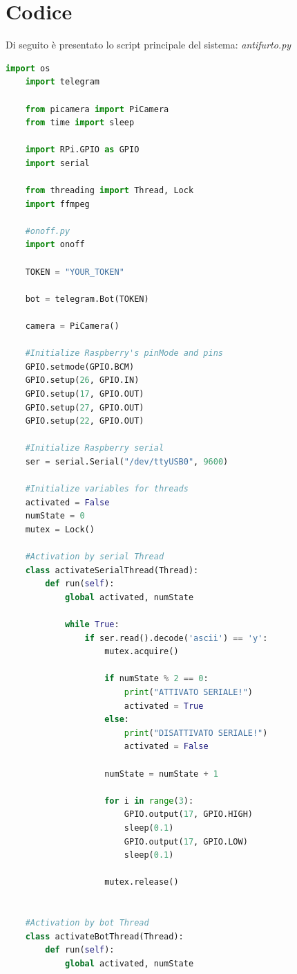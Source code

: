 \documentclass[12pt]{article}
\begin{document}
	\section{Codice}
	Di seguito è presentato lo script principale del sistema: \textit{antifurto.py}
	\begin{lstlisting}[language=Python]
	import os
	import telegram

	from picamera import PiCamera
	from time import sleep

	import RPi.GPIO as GPIO 
	import serial 

	from threading import Thread, Lock
	import ffmpeg

	#onoff.py
	import onoff

	TOKEN = "YOUR_TOKEN"

	bot = telegram.Bot(TOKEN)

	camera = PiCamera()

	#Initialize Raspberry's pinMode and pins
	GPIO.setmode(GPIO.BCM)
	GPIO.setup(26, GPIO.IN)
	GPIO.setup(17, GPIO.OUT)
	GPIO.setup(27, GPIO.OUT)
	GPIO.setup(22, GPIO.OUT)

	#Initialize Raspberry serial
	ser = serial.Serial("/dev/ttyUSB0", 9600)

	#Initialize variables for threads
	activated = False
	numState = 0
	mutex = Lock()

	#Activation by serial Thread
	class activateSerialThread(Thread):
    	def run(self):
        	global activated, numState

        	while True:
            	if ser.read().decode('ascii') == 'y':
                	mutex.acquire()
                
                	if numState % 2 == 0:
                    	print("ATTIVATO SERIALE!")
                    	activated = True
                	else:
                    	print("DISATTIVATO SERIALE!")
                    	activated = False
                
                	numState = numState + 1
              
                	for i in range(3):
                    	GPIO.output(17, GPIO.HIGH)
                    	sleep(0.1)
                    	GPIO.output(17, GPIO.LOW)
                    	sleep(0.1)
                
               		mutex.release()

                
	#Activation by bot Thread               
	class activateBotThread(Thread):
    	def run(self):
        	global activated, numState


\end{lstlisting}
\end{document}
